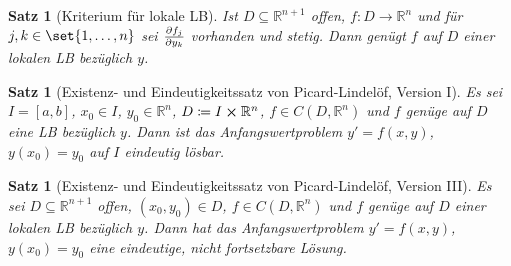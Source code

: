 \documentclass[a4paper]{article}
\theoremstyle{marginbreak}
\newtheorem{satz}[definition]{Satz}
\begin{document}
	\begin{satz}[Kriterium für lokale LB]
		Ist $D\subseteq\mathbb{R}^{n+1}$ offen, $f\colon D\to\mathbb{R}^n$ und für
		$j, k\in\set{1,\ldots,n}$ sei $\pdv{f_j}{y_k}$ vorhanden und stetig. Dann genügt
		$f$ auf $D$ einer lokalen LB bezüglich $y$.
	\end{satz}
	\begin{satz}[Existenz- und Eindeutigkeitssatz von Picard-Lindelöf, Version I]
		Es sei $I = \left[a, b\right]$, $x_0\in I$, $y_0\in\mathbb{R}^n$, $D\coloneqq I\cross\mathbb{R}^n$,
		$f\in C(D,\mathbb{R}^n)$ und $f$ genüge auf $D$ eine LB bezüglich $y$. Dann ist das Anfangswertproblem
		$y'=f(x, y)$, $y(x_0)=y_0$ auf $I$ eindeutig lösbar.
	\end{satz}
	\begin{satz}[Existenz- und Eindeutigkeitssatz von Picard-Lindelöf, Version III]
		Es sei $D\subseteq\mathbb{R}^{n+1}$ offen, $(x_0, y_0)\in D$, $f\in C(D, \mathbb{R}^n)$
		und $f$ genüge auf $D$ einer lokalen LB bezüglich $y$. Dann hat das Anfangswertproblem
		$y'=f(x, y)$, $y(x_0) = y_0$ eine eindeutige, nicht fortsetzbare Lösung.
	\end{satz}
\end{document}
